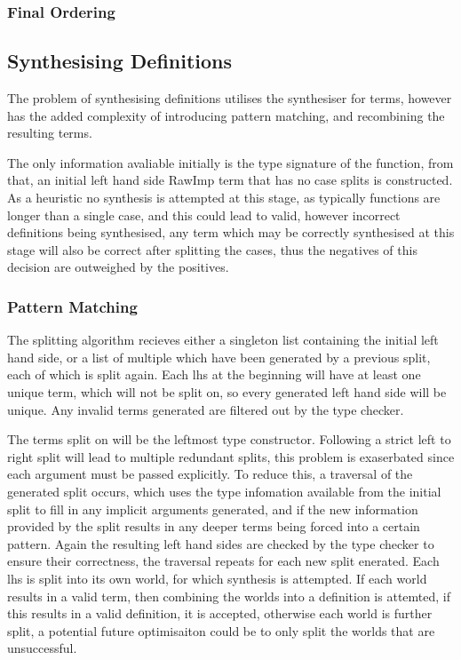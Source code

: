 \documentclass[a4paper]{article}
\begin{document}
\subsubsection{Final Ordering}
\label{sec:org4b2f139}

\subsection{Synthesising Definitions}
\label{sec:orgb092f42}

The problem of synthesising definitions utilises the synthesiser for
terms, however has the added complexity of introducing pattern matching, 
and recombining the resulting terms. 

The only information avaliable initially is the type 
signature of the function, from that, an initial left hand side RawImp
term that has no case splits is constructed. As a heuristic no synthesis 
is attempted at this stage, as typically functions are longer than a single 
case, and this could lead to valid, however incorrect definitions being
synthesised, any term which may be correctly synthesised at this stage will 
also be correct after splitting the cases, thus the negatives of this decision
are outweighed by the positives.

\subsubsection{Pattern Matching}
\label{sec:org90fab22}
The splitting algorithm recieves either a singleton list containing the initial
left hand side, or a list of multiple which have been generated by a previous split, 
each of which is split again. Each lhs at the beginning will have
at least one unique term, which will not be split on, so every generated
left hand side will be unique. Any invalid terms generated are filtered out by 
the type checker. 

The terms split on will be the leftmost type constructor. Following a strict 
left to right split will lead to multiple redundant splits, this problem is 
exaserbated since each argument must be passed explicitly. To reduce this, 
a traversal of the generated split occurs, which uses the type infomation 
available from the initial split to fill in any implicit arguments generated, 
and if the new information provided by the split results in any deeper terms 
being forced into a certain pattern. Again the resulting left hand sides are
checked by the type checker to ensure their correctness, the traversal repeats for
each new split enerated. Each lhs is split
into its own world, for which synthesis is attempted. If each world results 
in a valid term, then combining the worlds into a definition is attemted, if this
results in a valid definition, it is accepted, otherwise each world is further
split, a potential future optimisaiton could be to only split the worlds that are 
unsuccessful.
\end{document}
